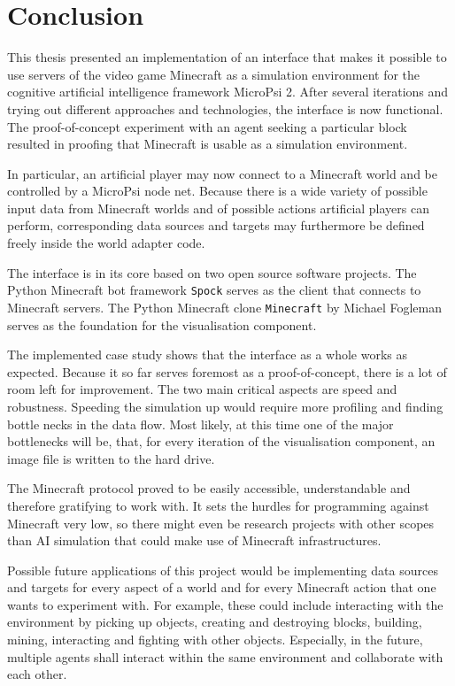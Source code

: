 \chapter{Conclusion}
\label{chap:5}
This thesis presented an implementation of an interface that makes it possible to use servers of the video game Minecraft as a simulation environment for the cognitive artificial intelligence framework MicroPsi 2. After several iterations and trying out different approaches and technologies, the interface is now functional. The proof-of-concept experiment with an agent seeking a particular block resulted in proofing that Minecraft is usable as a simulation environment.

In particular, an artificial player may now connect to a Minecraft world and be controlled by a MicroPsi node net. Because there is a wide variety of possible input data from Minecraft worlds and of possible actions artificial players can perform, corresponding data sources and targets may furthermore be defined freely inside the world adapter code.

The interface is in its core based on two open source software projects. The Python Minecraft bot framework \texttt{Spock} serves as the client that connects to Minecraft servers. The Python Minecraft clone \texttt{Minecraft} by Michael Fogleman serves as the foundation for the visualisation component.

The implemented case study shows that the interface as a whole works as expected. Because it so far serves foremost as a proof-of-concept, there is a lot of room left for improvement. The two main critical aspects are speed and robustness. Speeding the simulation up would require more profiling and finding bottle necks in the data flow. Most likely, at this time one of the major bottlenecks will be, that, for every iteration of the visualisation component, an image file is written to the hard drive.

The Minecraft protocol proved to be easily accessible, understandable and therefore gratifying to work with. It sets the hurdles for programming against Minecraft very low, so there might even be research projects with other scopes than AI simulation that could make use of Minecraft infrastructures.

Possible future applications of this project would be implementing data sources and targets for every aspect of a world and for every Minecraft action that one wants to experiment with. For example, these could include interacting with the environment by picking up objects, creating and destroying blocks, building, mining, interacting and fighting with other objects. Especially, in the future, multiple agents shall interact within the same environment and collaborate with each other.

